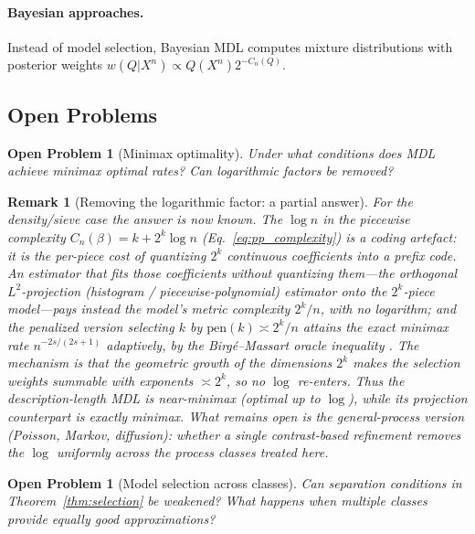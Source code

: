 \documentclass[preprint,review,12pt]{article}
\newtheorem{remark}[theorem]{Remark}
\newtheorem{openproblem}[theorem]{Open Problem}
\begin{document}
\paragraph{Bayesian approaches.}
Instead of model selection, Bayesian MDL computes mixture distributions 
with posterior weights $w(Q | X^n) \propto Q(X^n) 2^{-C_n(Q)}$.

\subsection{Open Problems}

\begin{openproblem}[Minimax optimality]
Under what conditions does MDL achieve minimax optimal rates? Can logarithmic
factors be removed?
\end{openproblem}

\begin{remark}[Removing the logarithmic factor: a partial answer]
\label{rem:remove-log}
For the density/sieve case the answer is now known. The $\log n$ in the piecewise
complexity $C_n(\beta)=k+2^k\log n$ (Eq.~\eqref{eq:pp_complexity}) is a
\emph{coding artefact}: it is the per-piece cost of quantizing $2^k$ continuous
coefficients into a prefix code. An estimator that fits those coefficients
\emph{without} quantizing them---the orthogonal $L^2$-projection (histogram /
piecewise-polynomial) estimator onto the $2^k$-piece model---pays instead the
model's metric complexity $2^k/n$, with \emph{no} logarithm; and the penalized
version selecting $k$ by $\mathrm{pen}(k)\asymp 2^k/n$ attains the exact minimax
rate $n^{-2s/(2s+1)}$ \emph{adaptively}, by the Birg\'e--Massart oracle inequality
\citep{Birge1998,Barron1999}. The mechanism is that the geometric growth of the
dimensions $2^k$ makes the selection weights summable with exponents $\asymp 2^k$,
so no $\log$ re-enters. Thus the description-length MDL is \emph{near-minimax}
(optimal up to $\log$), while its projection counterpart is \emph{exactly}
minimax. What remains open is the general-process version (Poisson, Markov,
diffusion): whether a single contrast-based refinement removes the $\log$
uniformly across the process classes treated here.
\end{remark}

\begin{openproblem}[Model selection across classes]
Can separation conditions in Theorem~\ref{thm:selection} be weakened? What 
happens when multiple classes provide equally good approximations?
\end{openproblem}
\end{document}
